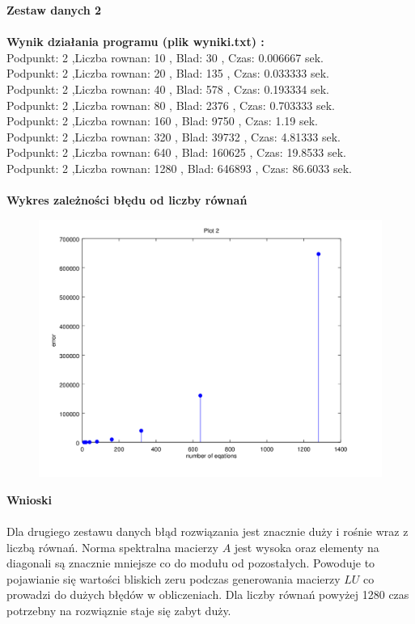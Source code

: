 \documentclass[a4paper, 11pt]{article}
\begin{document}
\vspace{1cm}
\textbf{Zestaw danych 2}\\
\\

\textbf{Wynik działania programu (plik wyniki.txt) :} \\
Podpunkt: 2 ,Liczba rownan: 10 , Blad: 30 , Czas: 0.006667 sek. \\
Podpunkt: 2 ,Liczba rownan: 20 , Blad: 135 , Czas: 0.033333 sek. \\
Podpunkt: 2 ,Liczba rownan: 40 , Blad: 578 , Czas: 0.193334 sek. \\
Podpunkt: 2 ,Liczba rownan: 80 , Blad: 2376 , Czas: 0.703333 sek. \\
Podpunkt: 2 ,Liczba rownan: 160 , Blad: 9750 , Czas: 1.19 sek. \\
Podpunkt: 2 ,Liczba rownan: 320 , Blad: 39732 , Czas: 4.81333 sek. \\
Podpunkt: 2 ,Liczba rownan: 640 , Blad: 160625 , Czas: 19.8533 sek. \\
Podpunkt: 2 ,Liczba rownan: 1280 , Blad: 646893 , Czas: 86.6033 sek. \\
\\
\vspace{11cm}
\textbf{Wykres zależności błędu od liczby równań}\\
\begin{figure}[th]
\includegraphics[width=\textwidth]{wykres2}
\end{figure}

\vspace{1cm}
\textbf{Wnioski}\\
\\
Dla drugiego zestawu danych błąd rozwiązania jest znacznie duży i rośnie wraz z liczbą równań. 
Norma spektralna macierzy $A$ jest wysoka oraz elementy na diagonali są znacznie mniejsze co do modułu od pozostałych. Powoduje to pojawianie się wartości bliskich zeru podczas generowania macierzy $LU$ co prowadzi do dużych błędów w obliczeniach. Dla liczby równań powyżej 1280 czas potrzebny na rozwiąznie staje się zabyt duży. 
\end{document}
